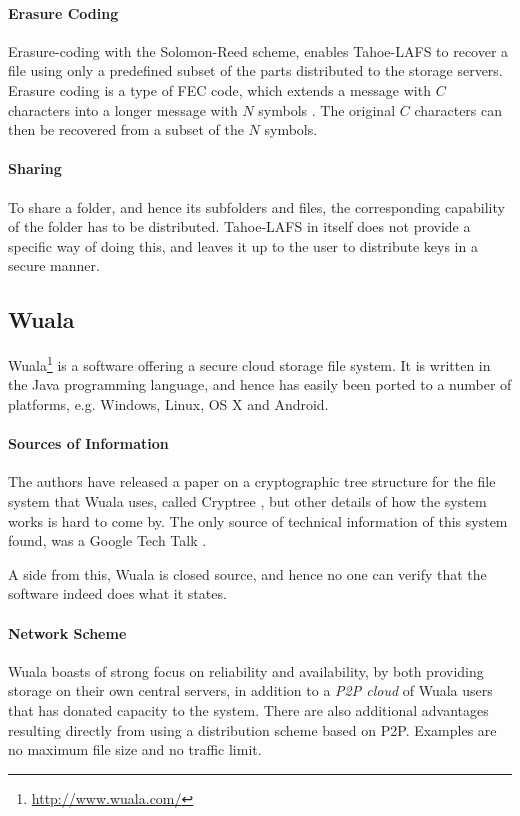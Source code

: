 \documentclass[pdftex,english,10pt,b5paper,twoside]{book}
\begin{document}
\paragraph{Erasure Coding} Erasure-coding with the Solomon-Reed scheme, enables
Tahoe-\ac{LAFS} to recover a file using only a predefined subset of the parts
distributed to the storage servers. Erasure coding is a type of \ac{FEC} code,
which extends a message with $C$ characters into a longer message with $N$
symbols \cite{t_reed-solomon}. The original $C$ characters can then be
recovered from a subset of the $N$ symbols.

\paragraph{Sharing} To share a folder, and hence its subfolders and files, the
corresponding capability of the folder has to be distributed. Tahoe-\ac{LAFS}
in itself does not provide a specific way of doing this, and leaves it up to
the user to distribute keys in a secure manner.

\subsection{Wuala}

Wuala\footnote{\url{http://www.wuala.com/}} is a software offering a secure
cloud storage file system. It is written in the Java programming language, and
hence has easily been ported to a number of platforms, e.g. Windows, Linux, OS
X and Android.

\paragraph{Sources of Information} The authors have released a paper on a
cryptographic tree structure for the file system that Wuala uses, called
Cryptree \cite{cryptree}, but other details of how the system works is hard to
come by. The only source of technical information of this system found, was a
Google Tech Talk \cite{wuala}.

A side from this, Wuala is closed source, and hence no one can verify that the
software indeed does what it states.

\paragraph{Network Scheme} Wuala boasts of strong focus on reliability and
availability, by both providing storage on their own central servers, in
addition to a \emph{\ac{P2P} cloud} of Wuala users that has donated capacity to
the system. There are also additional advantages resulting directly from using a
distribution scheme based on \ac{P2P}.  Examples are no maximum file size and no traffic limit.
\end{document}
